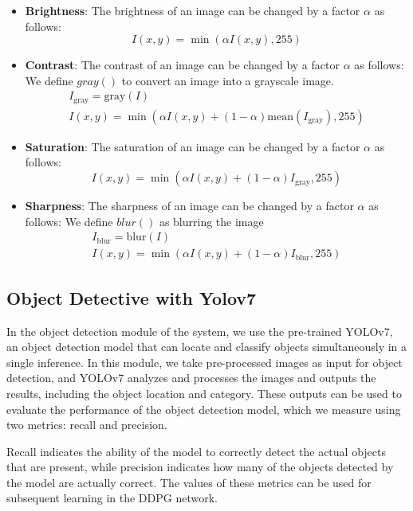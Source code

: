 \documentclass{PHlab-thesis}
\begin{document}
\begin{itemize}
\item \textbf{Brightness}: The brightness of an image can be changed by a factor $\alpha$ as follows:
\begin{equation*}
I(x,y)=\min(\alpha I(x,y),255)
\end{equation*}

\item \textbf{Contrast}: The contrast of an image can be changed by a factor $\alpha$ as follows: We define $gray()$ to convert an image into a grayscale image.
\begin{gather*}
I_{\text{gray}}=\text{gray}(I)\\
I(x,y)=\min(\alpha I(x,y)+(1-\alpha)\text{mean}(I_{\text{gray}}),255)
\end{gather*}

\item \textbf{Saturation}: The saturation of an image can be changed by a factor $\alpha$ as follows:
\begin{equation*}
I(x,y)=\min(\alpha I(x,y)+(1-\alpha)I_{\text{gray}},255)
\end{equation*}

\item \textbf{Sharpness}: The sharpness of an image can be changed by a factor $\alpha$ as follows: We define $blur()$ as blurring the image
\begin{gather*}
I_{\text{blur}}=\text{blur}(I) \\
I(x,y)=\min(\alpha I(x,y)+(1-\alpha)I_{\text{blur}},255)
\end{gather*}
\end{itemize}

\subsection{Object Detective with Yolov7}
In the object detection module of the system, we use the pre-trained YOLOv7, an object detection model that can locate and classify objects simultaneously in a single inference. In this module, we take pre-processed images as input for object detection, and YOLOv7 analyzes and processes the images and outputs the results, including the object location and category. These outputs can be used to evaluate the performance of the object detection model, which we measure using two metrics: recall and precision.

Recall indicates the ability of the model to correctly detect the actual objects that are present, while precision indicates how many of the objects detected by the model are actually correct. The values of these metrics can be used for subsequent learning in the DDPG network.
\end{document}
